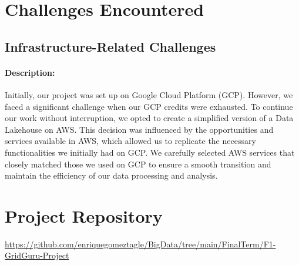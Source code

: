 \documentclass{article}
\begin{document}
\section{Challenges Encountered}
\subsection{Infrastructure-Related Challenges}
\paragraph{Description:}
Initially, our project was set up on Google Cloud Platform (GCP). However, we faced a significant challenge when our GCP credits were exhausted. To continue our work without interruption, we opted to create a simplified version of a Data Lakehouse on AWS. This decision was influenced by the opportunities and services available in AWS, which allowed us to replicate the necessary functionalities we initially had on GCP. We carefully selected AWS services that closely matched those we used on GCP to ensure a smooth transition and maintain the efficiency of our data processing and analysis.



\section{Project Repository}
\url{https://github.com/enriquegomeztagle/BigData/tree/main/FinalTerm/F1-GridGuru-Project}

\label{sec:references}
\begin{thebibliography}{9}

\end{thebibliography}
\end{document}
